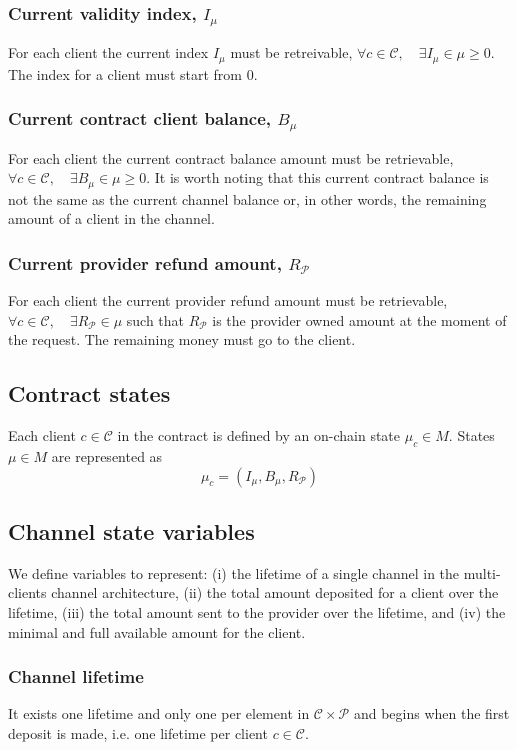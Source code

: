 \documentclass{llncs}
\begin{document}
\subsubsection{Current validity index, $I_\mu$} For each client the current index $I_\mu$ must be retreivable, $\forall c \in \mathcal{C}, \quad \exists I_\mu \in \mu \geq 0$. The index for a client must start from $0$.

\subsubsection{Current contract client balance, $B_\mu$} For each client the current contract balance amount must be retrievable, $\forall c \in \mathcal{C}, \quad \exists B_\mu \in \mu \geq 0$. It is worth noting that this current contract balance is not the same as the current channel balance or, in other words, the remaining amount of a client in the channel.

\subsubsection{Current provider refund amount, $R_\mathcal{P}$} For each client the current provider refund amount must be retrievable, $\forall c \in \mathcal{C}, \quad \exists R_\mathcal{P} \in \mu$ such that $R_\mathcal{P}$ is the provider owned amount at the moment of the request. The remaining money must go to the client.

\subsection{Contract states} Each client $c \in \mathcal{C}$ in the contract is defined by an on-chain state $\mu_c \in M$. States $\mu \in M$ are represented as
$$\mu_c = (I_\mu, B_\mu, R_\mathcal{P})$$

\subsection{Channel state variables} We define variables to represent: (i) the lifetime of a single channel in the multi-clients channel architecture, (ii) the total amount deposited for a client over the lifetime, (iii) the total amount sent to the provider over the lifetime, and (iv) the minimal and full available amount for the client.

\subsubsection{Channel lifetime} It exists one lifetime and only one per element in $\mathcal{C} \times \mathcal{P}$ and begins when the first deposit is made, i.e. one lifetime per client $c \in \mathcal{C}$.
\end{document}
